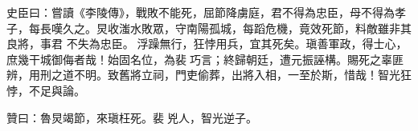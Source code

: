 \begin{pinyinscope}
 史臣曰：嘗讀《李陵傳》，戰敗不能死，屈節降虜庭，君不得為忠臣，母不得為孝子，每長嘆久之。炅收滍水敗眾，守南陽孤城，每蹈危機，竟效死節，料敵雖非其良將，事君
 不失為忠臣。浮躁無行，狂悖用兵，宜其死矣。瑱善軍政，得士心，庶幾干城御侮者哉！始固名位，為裴巧言；終歸朝廷，遭元振誣構。賜死之辜匪辨，用刑之道不明。致舊將立祠，門吏偷葬，出將入相，一至於斯，惜哉！智光狂悖，不足與論。



 贊曰：魯炅竭節，來瑱枉死。裴兇人，智光逆子。



\end{pinyinscope}